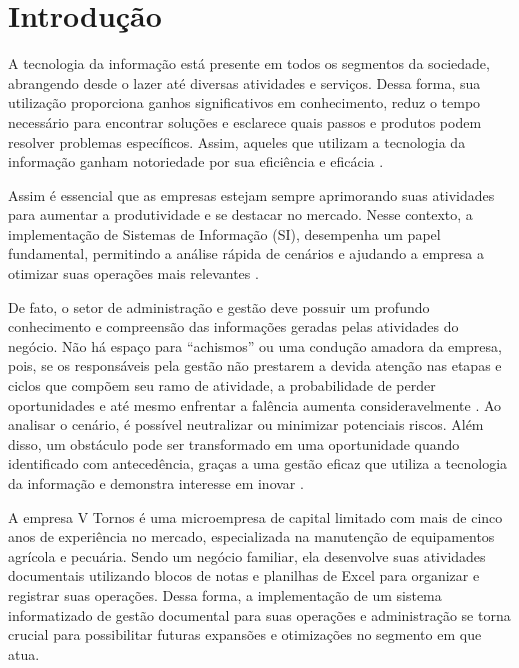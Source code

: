 \chapter{Introdução}
\label{cha:Introducao}

A tecnologia da informação está presente em todos os segmentos da sociedade, abrangendo desde o lazer até diversas atividades e serviços. Dessa forma, sua utilização proporciona ganhos significativos em conhecimento, reduz o tempo necessário para encontrar soluções e esclarece quais passos e produtos podem resolver problemas específicos. Assim, aqueles que utilizam a tecnologia da informação ganham notoriedade por sua eficiência e eficácia \mbox{\cite{a:gestao_inovacao_2024}.}

 Assim é essencial que as empresas estejam sempre aprimorando suas atividades para aumentar a produtividade e se destacar no mercado. Nesse contexto, a implementação de Sistemas de Informação (SI), desempenha um papel fundamental, permitindo a análise rápida de cenários e ajudando a empresa a otimizar suas operações mais relevantes \mbox{\cite{a:tecnologia_empresa_2024}.}

De fato, o setor de administração e gestão deve possuir um profundo conhecimento e compreensão das informações geradas pelas atividades do negócio. Não há espaço para ``achismos'' ou uma condução amadora da empresa, pois, se os responsáveis pela gestão não prestarem a devida atenção nas etapas e ciclos que compõem seu ramo de atividade, a probabilidade de perder oportunidades e até mesmo enfrentar a falência aumenta consideravelmente \mbox{\cite{b:administracao_gestao_2024}}. Ao analisar o cenário, é possível neutralizar ou minimizar potenciais riscos. Além disso, um obstáculo pode ser transformado em uma oportunidade quando identificado com antecedência, graças a uma gestão eficaz que utiliza a tecnologia da informação e demonstra interesse em inovar \mbox{\cite{a:gestao_inovacao_2024}}.

A empresa V Tornos é uma microempresa de capital limitado com mais de cinco anos de experiência no mercado, especializada na manutenção de equipamentos agrícola e pecuária. Sendo um negócio familiar, ela desenvolve suas atividades documentais utilizando blocos de notas e planilhas de Excel para organizar e registrar suas operações. Dessa forma, a implementação de um sistema informatizado de gestão documental para suas operações e administração se torna crucial para possibilitar futuras expansões e otimizações no segmento em que atua.


